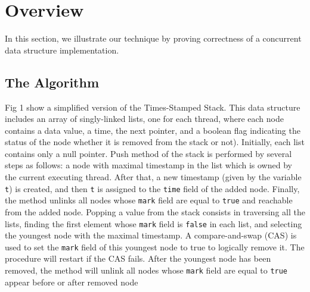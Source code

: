 \section{Overview}
\label{sec:overview}

In this section, we illustrate our technique by proving correctness of
a concurrent data structure implementation.

\subsection{The Algorithm}



Fig 1 show a simplified version of the Times-Stamped
Stack. This data structure includes an array of singly-linked lists, one for each thread, where each node contains a data value, a time, the next pointer, and a boolean flag indicating the status of the node whether it is removed from the stack or not). Initially, each list contains only a null pointer.
Push method of the stack is performed by several
steps as follows: a node with maximal timestamp
in the list which is owned by the current executing thread. After that, a new timestamp (given by
the variable {\tt t}) is created, and then {\tt t} is assigned to the {\tt time} field of the added node. Finally, the method unlinks all nodes whose {\tt mark} field are equal to {\tt true} and reachable from the added node. Popping a value from
the stack consists in traversing all the lists, finding
the first element whose {\tt mark} field is {\tt false} in each
list, and selecting the youngest node with the maximal
timestamp. A compare-and-swap (CAS) is used
to set the {\tt mark} field of this youngest node to true to logically remove it.
The procedure will restart if the CAS fails. After the youngest node has been removed, the method will unlink all nodes whose {\tt mark} field are equal to {\tt true} appear before or after removed  node

